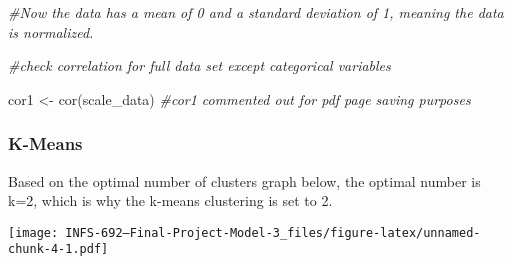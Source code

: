 \documentclass[
]{article}
\newenvironment{Shaded}{\begin{snugshade}}{\end{snugshade}}
\newcommand{\AttributeTok}[1]{\textcolor[rgb]{0.77,0.63,0.00}{#1}}
\newcommand{\CommentTok}[1]{\textcolor[rgb]{0.56,0.35,0.01}{\textit{#1}}}
\newcommand{\ControlFlowTok}[1]{\textcolor[rgb]{0.13,0.29,0.53}{\textbf{#1}}}
\newcommand{\DecValTok}[1]{\textcolor[rgb]{0.00,0.00,0.81}{#1}}
\newcommand{\FunctionTok}[1]{\textcolor[rgb]{0.00,0.00,0.00}{#1}}
\newcommand{\NormalTok}[1]{#1}
\newcommand{\OtherTok}[1]{\textcolor[rgb]{0.56,0.35,0.01}{#1}}
\newcommand{\SpecialCharTok}[1]{\textcolor[rgb]{0.00,0.00,0.00}{#1}}
\newcommand{\StringTok}[1]{\textcolor[rgb]{0.31,0.60,0.02}{#1}}
\begin{document}
\begin{Shaded}
\begin{Highlighting}[]
\CommentTok{\#Now the data has a mean of 0 and a standard deviation of 1, meaning the data is normalized. }


\CommentTok{\#check correlation for full data set except categorical variables}

\NormalTok{cor1 }\OtherTok{\textless{}{-}} \FunctionTok{cor}\NormalTok{(scale\_data)}
\CommentTok{\#cor1 commented out for pdf page saving purposes}
\end{Highlighting}
\end{Shaded}

\hypertarget{k-means}{%
\subsubsection{K-Means}\label{k-means}}

Based on the optimal number of clusters graph below, the optimal number
is k=2, which is why the k-means clustering is set to 2.

\begin{Shaded}
\end{Shaded}

\texttt{[image: INFS-692---Final-Project-Model-3\_files/figure-latex/unnamed-chunk-4-1.pdf]}
\end{document}
